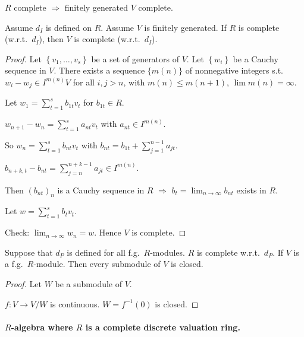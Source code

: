 \documentclass[11pt, a4paper]{report}
\begin{document}
\begin{theorem}
$R$ complete $\Rightarrow$ finitely generated $V$ complete.

Assume $d_{I}$ is defined on $R$. Assume $V$ is finitely generated. If $R$ is complete (w.r.t.\ $d_{I}$), then $V$ is complete (w.r.t.\ $d_{I}$).
\end{theorem}

\begin{proof}
Let $\left\{v_{1}, \ldots, v_{s}\right\}$ be a set of generators of $V$. Let $\left\{w_{i}\right\}$ be a Cauchy sequence in $V$. There exists a sequence $\{m(n)\}$ of nonnegative integers s.t.\ $w_{i} - w_{j} \in I^{m(n)} V$ for all $i, j > n$, with $m(n) \leq m(n+1)$, $\lim m(n) = \infty$.

Let $w_{1} = \sum_{t=1}^{s} b_{1t} v_{t}$ for $b_{1t} \in R$.

$w_{n+1} - w_{n} = \sum_{t=1}^{s} a_{nt} v_{t}$ with $a_{nt} \in I^{m(n)}$.

So $w_{n} = \sum_{t=1}^{s} b_{nt} v_{t}$ with $b_{nt} = b_{1t} + \sum_{j=1}^{n-1} a_{jt}$.

$b_{n+k, t} - b_{nt} = \sum_{j=n}^{n+k-1} a_{jt} \in I^{m(n)}$.

Then $\left(b_{nt}\right)_{n}$ is a Cauchy sequence in $R$ $\Rightarrow$ $b_{t} = \lim_{n \rightarrow \infty} b_{nt}$ exists in $R$.

Let $w = \sum_{t=1}^{s} b_{t} v_{t}$.

Check: $\lim_{n \rightarrow \infty} w_{n} = w$. Hence $V$ is complete.
\end{proof}

\begin{lemma}
Suppose that $d_P$ is defined for all f.g.\ $R$-modules. $R$ is complete w.r.t.\ $d_P$. If $V$ is a f.g.\ $R$-module. Then every submodule of $V$ is closed.
\end{lemma}

\begin{proof}
Let $W$ be a submodule of $V$.

$f: V \rightarrow V / W$ is continuous. $W=f^{-1}(0)$ is closed.

\end{proof}

\paragraph{$R$-algebra where $R$ is a complete discrete valuation ring.}
\end{document}
